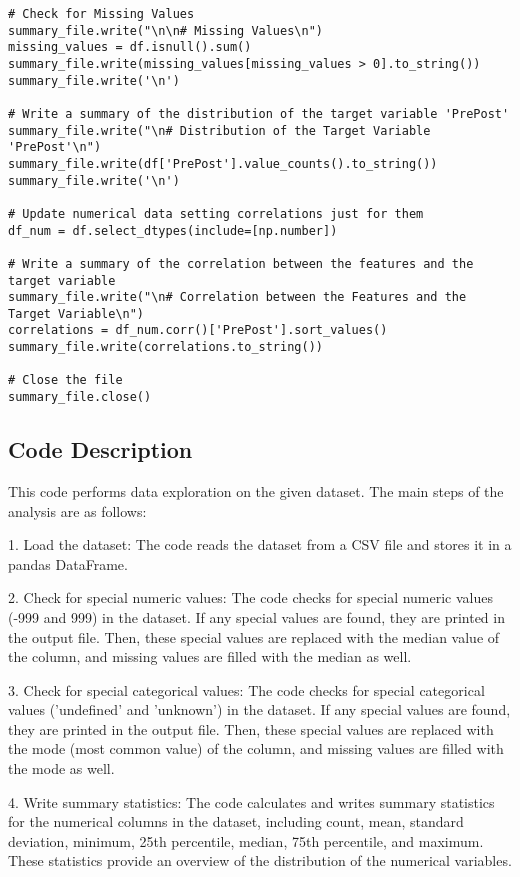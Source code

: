 \documentclass[11pt]{article}
\begin{document}
\begin{verbatim}
# Check for Missing Values
summary_file.write("\n\n# Missing Values\n")
missing_values = df.isnull().sum()
summary_file.write(missing_values[missing_values > 0].to_string())
summary_file.write('\n')

# Write a summary of the distribution of the target variable 'PrePost'
summary_file.write("\n# Distribution of the Target Variable 'PrePost'\n")
summary_file.write(df['PrePost'].value_counts().to_string())
summary_file.write('\n')

# Update numerical data setting correlations just for them
df_num = df.select_dtypes(include=[np.number])

# Write a summary of the correlation between the features and the target variable
summary_file.write("\n# Correlation between the Features and the Target Variable\n")
correlations = df_num.corr()['PrePost'].sort_values()
summary_file.write(correlations.to_string())

# Close the file
summary_file.close()

\end{verbatim}

\subsection{Code Description}

This code performs data exploration on the given dataset. The main steps of the analysis are as follows:

1. Load the dataset: The code reads the dataset from a CSV file and stores it in a pandas DataFrame.

2. Check for special numeric values: The code checks for special numeric values (-999 and 999) in the dataset. If any special values are found, they are printed in the output file. Then, these special values are replaced with the median value of the column, and missing values are filled with the median as well.

3. Check for special categorical values: The code checks for special categorical values ('undefined' and 'unknown') in the dataset. If any special values are found, they are printed in the output file. Then, these special values are replaced with the mode (most common value) of the column, and missing values are filled with the mode as well.

4. Write summary statistics: The code calculates and writes summary statistics for the numerical columns in the dataset, including count, mean, standard deviation, minimum, 25th percentile, median, 75th percentile, and maximum. These statistics provide an overview of the distribution of the numerical variables.
\end{document}

